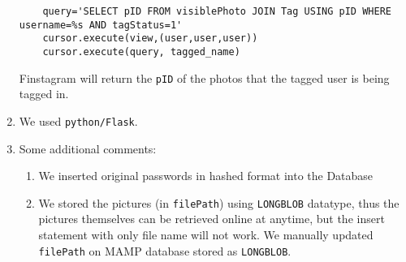 \documentclass[12pt]{article}
\begin{document}
\begin{enumerate}[label=\textbf{\arabic*.}, leftmargin=*]
\begin{lstlisting}
    query='SELECT pID FROM visiblePhoto JOIN Tag USING pID WHERE username=%s AND tagStatus=1'
    cursor.execute(view,(user,user,user))
    cursor.execute(query, tagged_name)
\end{lstlisting}
Finstagram will return the \lstinline{pID} of the photos that the tagged user is being tagged in.\\
\vspace{10pt}
\item We used \lstinline{python/Flask}. \\\vspace{10pt}
\item Some additional comments: 
\begin{enumerate}
\item We inserted original passwords in hashed format into the Database 
\item We stored the pictures (in \lstinline{filePath}) using \lstinline{LONGBLOB} datatype, thus the pictures themselves can be retrieved online at anytime, but the insert statement with only file name will not work. We manually updated \lstinline{filePath} on MAMP database stored as \lstinline{LONGBLOB}. 
\end{enumerate}

\end{enumerate}
\end{document}

